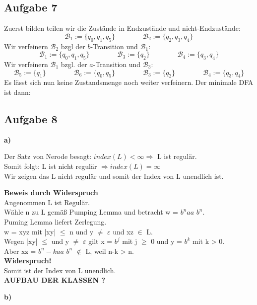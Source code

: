 \documentclass[a4paper,graphics,11pt]{article}
\newcommand{\aufgabe}[1]{\subsection*{Aufgabe #1}}
\begin{document}
\aufgabe{7}
Zuerst bilden teilen wir die Zustände in Endzustände und nicht-Endzustände:
$$
    \mathcal{B}_1 := \{q_0, q_1, q_5\}
    \qquad\qquad
    \mathcal{B}_2 := \{q_2, q_3, q_4\}
$$
Wir verfeinern $\mathcal{B}_2$ bzgl der $b$-Transition und $\mathcal{B}_1$:
$$
    \mathcal{B}_1 := \{q_0, q_1, q_5\}
    \qquad\qquad
    \mathcal{B}_3 := \{q_2\}
    \qquad\qquad
    \mathcal{B}_4 := \{q_3, q_4\}
$$
Wir verfeinern $\mathcal{B}_1$ bzgl. der $a$-Transition und $\mathcal{B}_3$:
$$
    \mathcal{B}_5 := \{q_1\}
    \qquad\qquad
    \mathcal{B}_6 := \{q_0, q_5\}
    \qquad\qquad
    \mathcal{B}_3 := \{q_2\}
    \qquad\qquad
    \mathcal{B}_4 := \{q_3, q_4\}
$$
Es lässt sich nun keine Zustandsmenge noch weiter verfeinern.
Der minimale DFA ist dann:
\begin{center}
\end{center}

\newpage
\aufgabe{8}

\textbf{a)}

Der Satz von Nerode besagt: $index(L) < \infty \Rightarrow$ L ist regulär.\\
Somit folgt: L ist nicht regulär $\Rightarrow index(L) = \infty$\\
Wir zeigen das L nicht regulär und somit der Index von L unendlich ist.

\textbf{Beweis durch Widerspruch}\\
Angenommen L ist Regulär.\\
Wähle n zu L gemäß Pumping Lemma und betracht w = $b^n aa $ $b^n$.\\
Puming Lemma liefert Zerlegung.\\
w = xyz mit |xy| $\leq$ n und y $\neq$ $\varepsilon$ und xz $\in$ L.\\
Wegen |xy| $\leq$ und y $\neq$ $\varepsilon$ gilt x = $b^j$ mit j $\geq$ 0 und y = $b^k$ mit k > 0.\\
Aber xz = $b^n-kaa$ $b^n$ $\not\in$ L, weil n-k > n.\\
\textbf{Widerspruch!}\\
Somit ist der Index von L unendlich.\\

\textbf{AUFBAU DER KLASSEN ?}

\textbf{b)}
\end{document}
